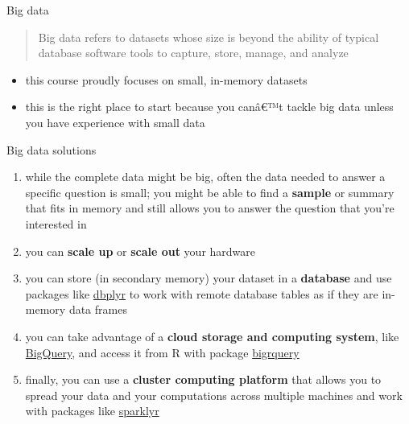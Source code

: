 \documentclass[
  ignorenonframetext,
]{beamer}
\providecommand{\tightlist}{%
  \setlength{\itemsep}{0pt}\setlength{\parskip}{0pt}}
\begin{document}
\begin{frame}{Big data}
\protect\hypertarget{big-data}{}
\begin{quote}
Big data refers to datasets whose size is beyond the ability of typical
database software tools to capture, store, manage, and analyze
\end{quote}

\begin{itemize}[<+->]
\tightlist
\item
  this course proudly focuses on small, in-memory datasets
\item
  this is the right place to start because you canâ€™t tackle big data
  unless you have experience with small data
\end{itemize}
\end{frame}

\begin{frame}{Big data solutions}
\protect\hypertarget{big-data-solutions}{}
\begin{enumerate}[<+->]
\tightlist
\item
  while the complete data might be big, often the data needed to answer
  a specific question is small; you might be able to find a
  \textbf{sample} or summary that fits in memory and still allows you to
  answer the question that you're interested in
\item
  you can \textbf{scale up} or \textbf{scale out} your hardware
\item
  you can store (in secondary memory) your dataset in a
  \textbf{database} and use packages like
  \href{https://cran.r-project.org/web/packages/dbplyr/index.html}{dbplyr}
  to work with remote database tables as if they are in-memory data
  frames
\item
  you can take advantage of a \textbf{cloud storage and computing
  system}, like
  \href{https://cloud.google.com/bigquery?hl=en}{BigQuery}, and access
  it from R with package
  \href{https://CRAN.R-project.org/package=bigrquery}{bigrquery}
\item
  finally, you can use a \textbf{cluster computing platform} that allows
  you to spread your data and your computations across multiple machines
  and work with packages like \href{https://spark.rstudio.com}{sparklyr}
\end{enumerate}
\end{frame}
\end{document}

